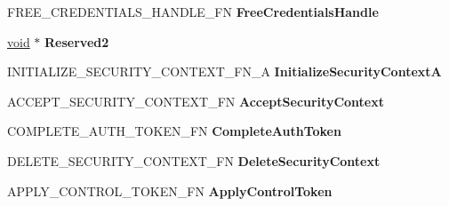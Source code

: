 \begin{DoxyCompactItemize}
F\+R\+E\+E\+\_\+\+C\+R\+E\+D\+E\+N\+T\+I\+A\+L\+S\+\_\+\+H\+A\+N\+D\+L\+E\+\_\+\+FN {\bfseries Free\+Credentials\+Handle}
\item 
\mbox{\label{struct___s_e_c_u_r_i_t_y___f_u_n_c_t_i_o_n___t_a_b_l_e___a_a8e6c19e17d1907380795ada249512475}} 
\hyperlink{interfacevoid}{void} $\ast$ {\bfseries Reserved2}
\item 
\mbox{\label{struct___s_e_c_u_r_i_t_y___f_u_n_c_t_i_o_n___t_a_b_l_e___a_a50aba7cafecf5d4a70e7a8015ec2270a}} 
I\+N\+I\+T\+I\+A\+L\+I\+Z\+E\+\_\+\+S\+E\+C\+U\+R\+I\+T\+Y\+\_\+\+C\+O\+N\+T\+E\+X\+T\+\_\+\+F\+N\+\_\+A {\bfseries Initialize\+Security\+ContextA}
\item 
\mbox{\label{struct___s_e_c_u_r_i_t_y___f_u_n_c_t_i_o_n___t_a_b_l_e___a_ae15b8253a11c42d00554633aaa1fe8a2}} 
A\+C\+C\+E\+P\+T\+\_\+\+S\+E\+C\+U\+R\+I\+T\+Y\+\_\+\+C\+O\+N\+T\+E\+X\+T\+\_\+\+FN {\bfseries Accept\+Security\+Context}
\item 
\mbox{\label{struct___s_e_c_u_r_i_t_y___f_u_n_c_t_i_o_n___t_a_b_l_e___a_ad220c19a3c5e09ae034e22ffdeaab7ca}} 
C\+O\+M\+P\+L\+E\+T\+E\+\_\+\+A\+U\+T\+H\+\_\+\+T\+O\+K\+E\+N\+\_\+\+FN {\bfseries Complete\+Auth\+Token}
\item 
\mbox{\label{struct___s_e_c_u_r_i_t_y___f_u_n_c_t_i_o_n___t_a_b_l_e___a_a108f901f31da1356f456313eb10ea064}} 
D\+E\+L\+E\+T\+E\+\_\+\+S\+E\+C\+U\+R\+I\+T\+Y\+\_\+\+C\+O\+N\+T\+E\+X\+T\+\_\+\+FN {\bfseries Delete\+Security\+Context}
\item 
\mbox{\label{struct___s_e_c_u_r_i_t_y___f_u_n_c_t_i_o_n___t_a_b_l_e___a_a171b5cee7c9daa5e2ad9308dec6ad8ff}} 
A\+P\+P\+L\+Y\+\_\+\+C\+O\+N\+T\+R\+O\+L\+\_\+\+T\+O\+K\+E\+N\+\_\+\+FN {\bfseries Apply\+Control\+Token}
\item 
\mbox{\label{struct___s_e_c_u_r_i_t_y___f_u_n_c_t_i_o_n___t_a_b_l_e___a_afd51712089be2298c9ec29c03522351b}} 

\end{DoxyCompactItemize}
